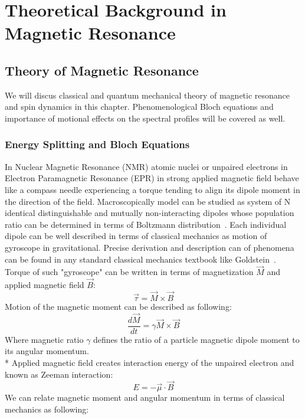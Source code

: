 \chapter{Theoretical Background in Magnetic Resonance}
\section{Theory of Magnetic Resonance}
We will discus classical and quantum mechanical theory of magnetic resonance and spin dynamics in this chapter. Phenomenological Bloch equations and importance of motional effects on the spectral profiles will be covered as well.
\subsection{Energy Splitting and Bloch Equations}\label{blochsection}
In Nuclear Magnetic Resonance (NMR) atomic nuclei or unpaired electrons in Electron Paramagnetic Resonance (EPR) in strong applied magnetic field behave like a compass needle experiencing a torque tending to align its dipole moment in the direction of the field. Macroscopically model can be studied as system of N identical distinguishable and mutually non-interacting dipoles whose population ratio can be determined in terms of Boltzmann distribution~\cite{pathria}. Each individual dipole can be well described in terms of classical mechanics as motion of gyroscope in gravitational. Precise derivation and description can of phenomena can be found in any standard classical mechanics textbook like Goldstein~\cite{gold}. Torque of such "gyroscope" can be written in terms of magnetization $\vec{M}$ and applied magnetic field $\vec{B}$:
\begin{equation}\label{eq:torque}
\vec{\tau}=\vec{M}\times\vec{B}
\end{equation}
Motion of the magnetic moment can be described as following: 
\begin{equation}\label{eq:torque2}
\frac{d\vec{M}}{dt}=\gamma\vec{M}\times\vec{B}
\end{equation}
Where magnetic ratio $\gamma$ defines the ratio of a particle magnetic dipole moment to its angular momentum.\\*
Applied magnetic field creates interaction energy of the unpaired electron and known as Zeeman interaction: 
\begin{equation}\label{eq:1}
E = - \vec{\mu}\cdot \vec{B}
\end{equation}  
We can relate magnetic moment and angular momentum in terms of classical mechanics as following: 
